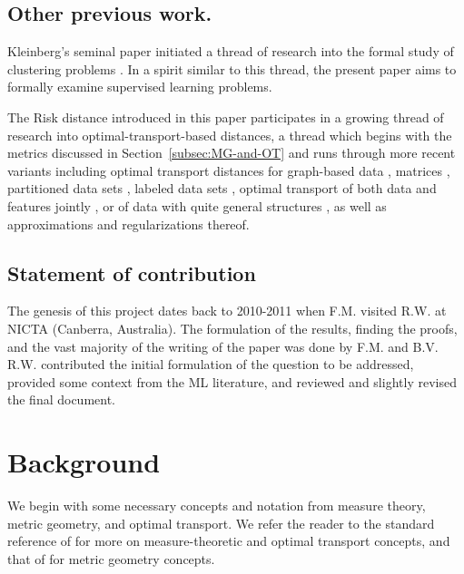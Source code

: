 \documentclass[twoside,11pt]{article}
\begin{document}
\subsection{Other previous work.}
Kleinberg's seminal paper \citep{kleinberg} initiated a thread of research into the formal study of clustering problems \citep{carlsson2010characterization,carlsson_classifying_2013, ackerman_towards_2012, CohenAddad2018ClusteringRT}. In a spirit similar to this thread, the present paper aims to formally examine supervised learning problems. 


The Risk distance introduced in this paper participates in a growing thread of research into optimal-transport-based distances, a thread which begins with the metrics discussed in Section~\ref{subsec:MG-and-OT} and runs through more recent variants including optimal transport distances for graph-based data \citep{chowdhury_gromovwasserstein_2019, chen2022weisfeiler}, matrices \citep{peyre_gromov-wasserstein_2016}, partitioned data sets \citep{chowdhury_quantized_2021}, labeled data sets \citep{alvarez-melis2020geometric}, optimal transport of both data and features jointly \citep{titouan_co-optimal_2020}, or of data with quite general structures \citep{Vayer2020FusedGD,patterson2020}, as well as approximations \citep{scetbon2022linear,sejourne_unbalanced_2021,VincentCuaz2021SemirelaxedGW} and regularizations \citep{peyre_gromov-wasserstein_2016} thereof.






\subsection{Statement of contribution}
The genesis of this project dates back to 2010-2011 when F.M. visited R.W. at NICTA (Canberra, Australia). The formulation of the results, finding the proofs, and the vast majority of the
writing of the paper was done by F.M. and B.V. R.W. contributed the initial formulation
of the question to be addressed, provided some context from the ML literature,
and reviewed and slightly revised the final document.

\tableofcontents

\section{Background}

We begin with some necessary concepts and notation from measure theory, metric geometry, and optimal transport. We refer the reader to the standard reference of \citet{villani_topics_2003} for more on measure-theoretic and optimal transport concepts, and that of \citet*{BBI} for metric geometry concepts. 
\end{document}
